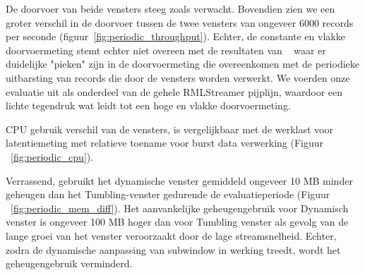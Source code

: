De doorvoer van beide vensters steeg zoals verwacht.
Bovendien zien we een groter verschil in de doorvoer tussen de 
twee vensters van ongeveer 6000 records per seconde 
(figuur~\ref{fig:periodic_throughput}). Echter, de
constante en vlakke doorvoermeting stemt echter niet overeen 
met de resultaten van ~\cite{evalution_of_spe} waar er duidelijke "pieken" zijn in 
de doorvoermeting die overeenkomen met de periodieke uitbarsting 
van records die door de vensters worden verwerkt. 
We voerden onze evaluatie uit als onderdeel van de gehele RMLStreamer pijplijn, waardoor 
een lichte tegendruk 
wat leidt tot een hoge en vlakke doorvoermeting. 


CPU gebruik verschil van de vensters, is vergelijkbaar met de 
werklast voor latentiemeting met relatieve toename voor 
burst data verwerking
(Figuur ~\ref{fig:periodic_cpu}). 

Verrassend,
gebruikt het dynamische venster 
gemiddeld ongeveer 10 MB minder geheugen dan het Tumbling-venster gedurende de evaluatieperiode 
(Figuur ~\ref{fig:periodic_mem_diff}). 
Het aanvankelijke geheugengebruik voor Dynamisch venster is ongeveer 100 MB hoger dan voor 
Tumbling venster als gevolg van de lange groei van het venster 
veroorzaakt door de lage streamsnelheid. Echter, zodra 
de dynamische aanpassing van subwindow in werking treedt, wordt het geheugengebruik verminderd.


